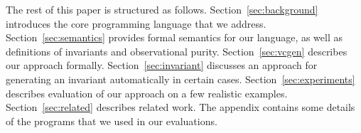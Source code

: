 
The rest of this paper is structured as
follows. Section~\ref{sec:background} introduces the core programming
language that we address. Section~\ref{sec:semantics} provides formal
semantics for our language, as well as definitions of invariants and
observational purity. Section~\ref{sec:vcgen} describes our approach
formally. Section~\ref{sec:invariant} discusses an approach for generating
an invariant automatically in certain cases. Section~\ref{sec:experiments}  describes evaluation of our approach on a few realistic examples.
Section~\ref{sec:related} describes related work. The appendix contains some details of the programs
that we used in our evaluations. 

